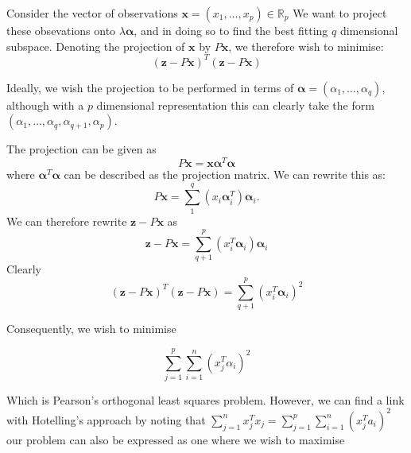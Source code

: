 Consider the vector of observations $\boldsymbol{x} = (x_{1}, \ldots, x_{p}) \in \mathbb{R}_{p}$   We want to project these obsevations onto $\lambda \boldsymbol{\alpha}$, and in doing so to find the best fitting $q$ dimensional subspace.   Denoting the projection of $\boldsymbol{x}$ by $P\boldsymbol{x}$, we therefore wish to minimise:
\begin{displaymath}
(\boldsymbol{z} - P\boldsymbol{x})^{T}(\boldsymbol{z} - P\boldsymbol{x})
\end{displaymath}

Ideally, we wish the projection to be performed in terms of $\boldsymbol{\alpha} = (\alpha_{1}, \ldots, \alpha_{q})$, although with a $p$ dimensional representation this can clearly take the form $(\alpha_{1}, \ldots, \alpha_{q}, \alpha_{q+1}, \alpha_{p})$.  

The projection can be given as 
\begin{displaymath}
P\boldsymbol{x} = \boldsymbol{x} \boldsymbol{\alpha}^{T}\boldsymbol{\alpha}
\end{displaymath}
where $\boldsymbol{\alpha}^{T}\boldsymbol{\alpha}$ can be described as the projection matrix.   We can rewrite this as:
\begin{displaymath}
P\boldsymbol{x} = \sum_{1}^{q} (x_{i} \boldsymbol{\alpha}_{i}^{T})\boldsymbol{\alpha}_{i}.   
\end{displaymath}
We can therefore rewrite $\boldsymbol{z} - P\boldsymbol{x}$ as 
\begin{displaymath}
\boldsymbol{z} - P\boldsymbol{x} = \sum_{q+1}^{p}(x_{i}^{T} \boldsymbol{\alpha}_{i})\boldsymbol{\alpha}_{i}
\end{displaymath}
Clearly
\begin{displaymath}
(\boldsymbol{z} - P\boldsymbol{x})^{T}(\boldsymbol{z} - P\boldsymbol{x}) = \sum_{q+1}^{p}(x_{i}^{T}\boldsymbol{\alpha}_{i})^{2}
\end{displaymath}

Consequently, we wish to minimise 

\begin{displaymath}
\sum_{j=1}^{p} \sum_{i=1}^{n} (x_{j}^{T}\alpha_{i})^{2}
\end{displaymath}

Which is Pearson's orthogonal least squares problem.  However, we can find a link with Hotelling's approach by noting that $\sum_{j=1}^{n}x_{j}^{T}x_{j} = \sum_{j=1}^{p} \sum_{i=1}^{n} (x_{j}^{T}a_{i})^{2}$ our problem can also be expressed as one where we wish to maximise

